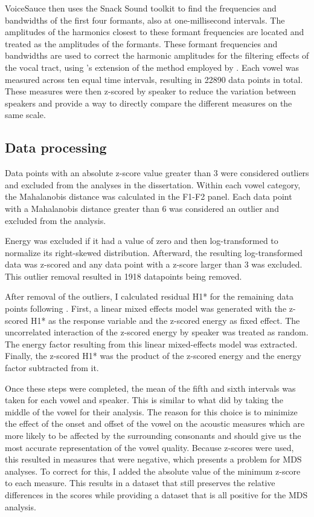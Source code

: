 VoiceSauce then uses the Snack Sound toolkit \citep{sjolanderSnackSoundToolkit2004} to find the frequencies and bandwidths of the first four formants, also at one-millisecond intervals. The amplitudes of the harmonics closest to these formant frequencies are located and treated as the amplitudes of the formants. These formant frequencies and bandwidths are used to correct the harmonic amplitudes for the filtering effects of the vocal tract, using \citeauthor{iseliAgeSexVowel2007}'s \citeyear{iseliAgeSexVowel2007} extension of the method employed by \citet{hansonGlottalCharacteristicsFemale1997}. Each vowel was measured across ten equal time intervals, resulting in 22890 data points in total. These measures were then z-scored by speaker to reduce the variation between speakers and provide a way to directly compare the different measures on the same scale.

\subsection{Data processing} \label{sec:acousticlandscape:processing}
Data points with an absolute z-score value greater than 3 were considered outliers and excluded from the analyses in the dissertation. Within each vowel category, the Mahalanobis distance was calculated in the F1-F2 panel. Each data point with a Mahalanobis distance greater than 6 was considered an outlier and excluded from the analysis.  

Energy was excluded if it had a value of zero and then log-transformed to normalize its right-skewed distribution. Afterward, the resulting log-transformed data was z-scored and any data point with a z-score larger than 3 was excluded. This outlier removal resulted in 1918 datapoints being removed. 

After removal of the outliers, I calculated residual H1* for the remaining data points following \citet{chaiH1H2Acoustic2022}. First, a linear mixed effects model was generated with the z-scored H1* as the response variable and the z-scored energy as fixed effect. The uncorrelated interaction of the z-scored energy by speaker was treated as random. The energy factor resulting from this linear mixed-effects model was extracted. Finally, the z-scored H1* was the product of the z-scored energy and the energy factor subtracted from it.

Once these steps were completed, the mean of the fifth and sixth intervals was taken for each vowel and speaker. This is similar to what \citet{keatingCrosslanguageAcousticSpace2023} did by taking the middle of the vowel for their analysis. The reason for this choice is to minimize the effect of the onset and offset of the vowel on the acoustic measures which are more likely to be affected by the surrounding consonants and should give us the most accurate representation of the vowel quality. Because z-scores were used, this resulted in measures that were negative, which presents a problem for MDS analyses. To correct for this, I added the absolute value of the minimum z-score to each measure. This results in a dataset that still preserves the relative differences in the scores while providing a dataset that is all positive for the MDS analysis.


